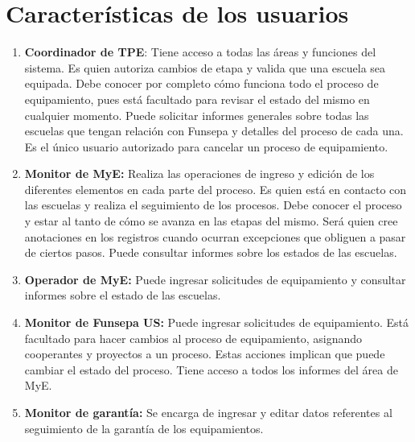 \documentclass[11pt]{report}
\begin{document}
	\section{Características de los usuarios}
	\begin{enumerate}
		\item \textbf{Coordinador de TPE}: Tiene acceso a todas las áreas y funciones del sistema. Es quien autoriza cambios de etapa y valida que una escuela sea equipada.
		Debe conocer por completo cómo funciona todo el proceso de equipamiento, pues está facultado para revisar el estado del mismo en cualquier momento.
		Puede solicitar informes generales sobre todas las escuelas que tengan relación con Funsepa y detalles del proceso de cada una.
		Es el único usuario autorizado para cancelar un proceso de equipamiento.
		\item \textbf{Monitor de MyE:} Realiza las operaciones de ingreso y edición de los diferentes elementos en cada parte del proceso. Es quien está en contacto con las escuelas y realiza el seguimiento de los procesos.
		Debe conocer el proceso y estar al tanto de cómo se avanza en las etapas del mismo. Será quien cree anotaciones en los registros cuando ocurran excepciones que obliguen a pasar de ciertos pasos.
		Puede consultar informes sobre los estados de las escuelas.
		\item \textbf{Operador de MyE:} Puede ingresar solicitudes de equipamiento y consultar informes sobre el estado de las escuelas.
		\item \textbf{Monitor de Funsepa US:} Puede ingresar solicitudes de equipamiento. Está facultado para hacer cambios al proceso de equipamiento, asignando cooperantes y proyectos a un proceso. Estas acciones implican que puede cambiar el estado del proceso.
		Tiene acceso a todos los informes del área de MyE.
		\item \textbf{Monitor de garantía:} Se encarga de ingresar y editar datos referentes al seguimiento de la garantía de los equipamientos.
	\end{enumerate}
	
\end{document}
